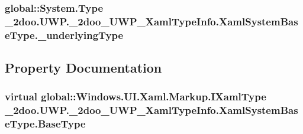 \hypertarget{class__2doo_1_1_u_w_p_1_1__2doo___u_w_p___xaml_type_info_1_1_xaml_system_base_type_7439f69f0a299f1ea45ecbc307ea26c3}{
\subsubsection[{\_\-underlyingType}]{\setlength{\rightskip}{0pt plus 5cm}global::System.Type {\bf \_\-2doo.UWP.\_\-2doo\_\-UWP\_\-XamlTypeInfo.XamlSystemBaseType.\_\-underlyingType}}}
\label{class__2doo_1_1_u_w_p_1_1__2doo___u_w_p___xaml_type_info_1_1_xaml_system_base_type_7439f69f0a299f1ea45ecbc307ea26c3}




\subsection{Property Documentation}
\hypertarget{class__2doo_1_1_u_w_p_1_1__2doo___u_w_p___xaml_type_info_1_1_xaml_system_base_type_3c767e4849c9f01b5a4595074bb1a155}{
\subsubsection[{BaseType}]{\setlength{\rightskip}{0pt plus 5cm}virtual global::Windows.UI.Xaml.Markup.IXamlType \_\-2doo.UWP.\_\-2doo\_\-UWP\_\-XamlTypeInfo.XamlSystemBaseType.BaseType}}
\label{class__2doo_1_1_u_w_p_1_1__2doo___u_w_p___xaml_type_info_1_1_xaml_system_base_type_3c767e4849c9f01b5a4595074bb1a155}


